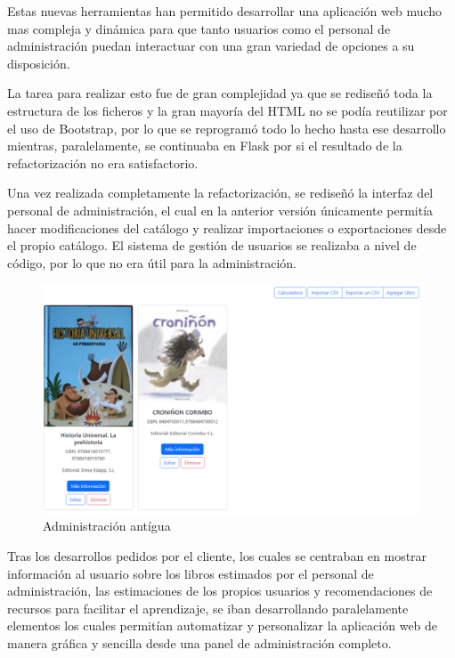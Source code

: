Estas nuevas herramientas han permitido desarrollar una aplicación web mucho mas compleja y dinámica para que tanto usuarios como el personal de administración puedan interactuar con una gran variedad de opciones a su disposición.

La tarea para realizar esto fue de gran complejidad ya que se rediseñó toda la estructura de los ficheros y la gran mayoría del HTML no se podía reutilizar por el uso de Bootstrap, por lo que se reprogramó todo lo hecho hasta ese desarrollo mientras, paralelamente, se continuaba en Flask por si el resultado de la refactorización no era satisfactorio. 


Una vez realizada completamente la refactorización, se rediseñó la interfaz del personal de administración, el cual en la anterior versión únicamente permitía hacer modificaciones del catálogo y realizar importaciones o exportaciones desde el propio catálogo. El sistema de gestión de usuarios se realizaba a nivel de código, por lo que no era útil para la administración.

\begin{figure}[h]
    \centering
    \includegraphics[width=0.9\linewidth]{Imagenes/administracionAntiguo.png}
    \caption{Administración antígua}
    \label{Administración antígua}
\end{figure}
\FloatBarrier

Tras los desarrollos pedidos por el cliente, los cuales se centraban en mostrar información al usuario sobre los libros estimados por el personal de administración, las estimaciones de los propios usuarios y recomendaciones de recursos para facilitar el aprendizaje, se iban desarrollando paralelamente elementos los cuales permitían automatizar y personalizar la aplicación web de manera gráfica y sencilla desde una panel de administración completo.

